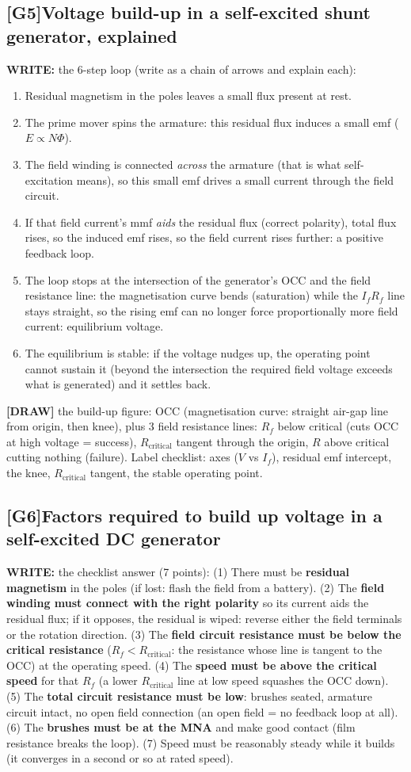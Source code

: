 \documentclass[11pt]{article}
\newcommand{\q}[2]{\subsection*{\color{copper}#1\quad\color{iron}#2}}
\newcommand{\w}[1]{\textbf{\color{copper}WRITE:} #1}
\newcommand{\dw}[1]{\textbf{\color{muted}[DRAW]} #1}
\begin{document}
\q{[G5]}{Voltage build-up in a self-excited shunt generator, explained}
\w{the 6-step loop (write as a chain of arrows and explain each):}
\begin{enumerate}[label=\arabic*.]
\item Residual magnetism in the poles leaves a small flux present at rest.
\item The prime mover spins the armature: this residual flux induces a small emf ($E \propto N \Phi$).
\item The field winding is connected \emph{across} the armature (that is what self-excitation means), so this small emf drives a small current through the field circuit.
\item If that field current's mmf \emph{aids} the residual flux (correct polarity), total flux rises, so the induced emf rises, so the field current rises further: a positive feedback loop.
\item The loop stops at the intersection of the generator's OCC and the field resistance line: the magnetisation curve bends (saturation) while the $I_f R_f$ line stays straight, so the rising emf can no longer force proportionally more field current: equilibrium voltage.
\item The equilibrium is stable: if the voltage nudges up, the operating point cannot sustain it (beyond the intersection the required field voltage exceeds what is generated) and it settles back.
\end{enumerate}
\dw{the build-up figure: OCC (magnetisation curve: straight air-gap line from origin, then knee), plus 3 field resistance lines: $R_f$ below critical (cuts OCC at high voltage = success), $R_{\text{critical}}$ tangent through the origin, $R$ above critical cutting nothing (failure). Label checklist: axes ($V$ vs $I_f$), residual emf intercept, the knee, $R_{\text{critical}}$ tangent, the stable operating point.}

\q{[G6]}{Factors required to build up voltage in a self-excited DC generator}
\w{the checklist answer (7 points):} (1) There must be \textbf{residual magnetism} in the poles (if lost: flash the field from a battery). (2) The \textbf{field winding must connect with the right polarity} so its current aids the residual flux; if it opposes, the residual is wiped: reverse either the field terminals or the rotation direction. (3) The \textbf{field circuit resistance must be below the critical resistance} ($R_f < R_{\text{critical}}$: the resistance whose line is tangent to the OCC) at the operating speed. (4) The \textbf{speed must be above the critical speed} for that $R_f$ (a lower $R_{\text{critical}}$ line at low speed squashes the OCC down). (5) The \textbf{total circuit resistance must be low}: brushes seated, armature circuit intact, no open field connection (an open field = no feedback loop at all). (6) The \textbf{brushes must be at the MNA} and make good contact (film resistance breaks the loop). (7) Speed must be reasonably steady while it builds (it converges in a second or so at rated speed).
\end{document}
